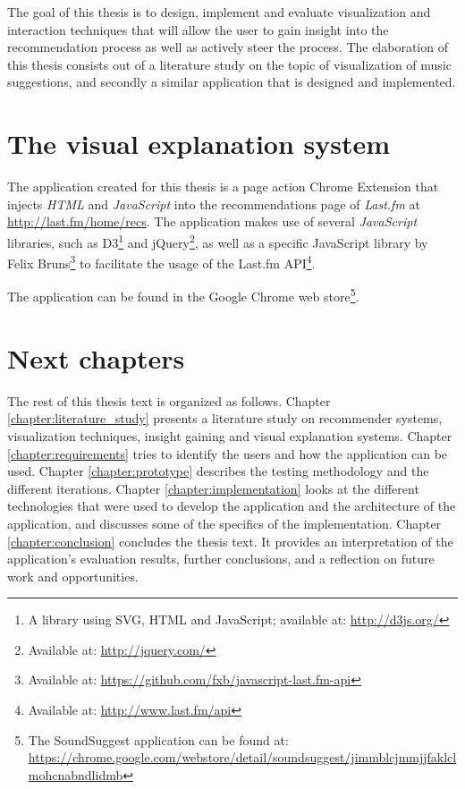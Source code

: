 The goal of this thesis is to design, implement and evaluate visualization and interaction techniques that will allow the user to gain insight into the recommendation process as well as actively steer the process. The elaboration of this thesis consists out of a literature study on the topic of visualization of music suggestions, and secondly a similar application that is designed and implemented\cite{kuleuven:2008:t313}.


\section{The visual explanation system}\label{chapter:introduction:section:application}

The application created for this thesis is a page action Chrome Extension that injects \emph{HTML} and \emph{JavaScript} into the recommendations page of \emph{Last.fm} at \url{http://last.fm/home/recs}. The application makes use of several \emph{JavaScript} libraries, such as D3\footnote{A library using SVG, HTML and JavaScript\cite{bostock:2012:d3js}; available at: \url{http://d3js.org/}} and jQuery\footnote{Available at: \url{http://jquery.com/}}, as well as a specific JavaScript library by Felix Bruns\footnote{Available at: \url{https://github.com/fxb/javascript-last.fm-api}} to facilitate the usage of the Last.fm API\footnote{Available at: \url{http://www.last.fm/api}}.

The application can be found in the Google Chrome web store\footnote{The SoundSuggest application can be found at: \url{https://chrome.google.com/webstore/detail/soundsuggest/jimmblcjmmjjfaklclmohcnabndlidmb}}.


\section{Next chapters}\label{chapter:introduction:section:chapters}

The rest of this thesis text is organized as follows. Chapter \ref{chapter:literature_study} presents a literature study on recommender systems, visualization techniques, insight gaining and visual explanation systems. Chapter \ref{chapter:requirements} tries to identify the users and how the application can be used. Chapter \ref{chapter:prototype} describes the testing methodology and the different iterations. Chapter \ref{chapter:implementation} looks at the different technologies that were used to develop the application and the architecture of the application, and discusses some of the specifics of the implementation. Chapter \ref{chapter:conclusion} concludes the thesis text. It provides an interpretation of the application's evaluation results, further conclusions, and a reflection on future work and opportunities.
